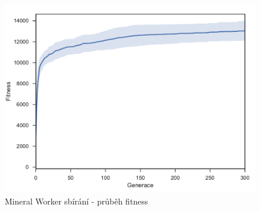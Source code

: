\begin{figure}[t]\centering
	\includegraphics[width=\columnwidth]{../img/MineralMap/MineralWorkerPickup}
	\caption{Mineral Worker sbírání - průběh fitness}
	\label{obr04:MineralWorkerPickUp}
\end{figure}
\clearpage

